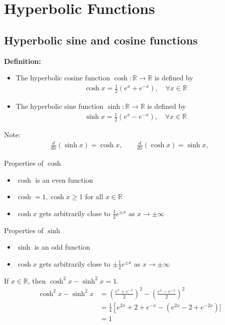 \documentclass{report}
\begin{document}
\chapter{Hyperbolic Functions}
	
	\section{Hyperbolic sine and cosine functions}

	\textbf{Definition:}
	\begin{itemize}
		\item The hyperbolic cosine function $\cosh: \mathbb{R} \to \mathbb{R}$ is defined by
			\begin{align*}
				\cosh x = \frac{1}{2} (e^x + e^{-x}), \quad \forall x \in \mathbb{R}
			\end{align*}
		\item The hyperbolic sine function $\sinh: \mathbb{R} \to \mathbb{R}$ is defined by
			\begin{align*}
				\sinh x = \frac{1}{2} (e^x - e^{-x}), \quad \forall x \in \mathbb{R}
			\end{align*}
	\end{itemize}

	Note:
	\begin{align*}
		\frac{d}{dx} (\sinh x) = \cosh x, \qquad \frac{d}{dx} (\cosh x) = \sinh x,
	\end{align*}

	Properties of $\cosh$
	\begin{itemize}
		\item $\cosh$ is an even function
		\item $\cosh = 1, \cosh x \geq 1$ for all $x \in \mathbb{R}$
		\item $\cosh x$ gets arbitrarily close to $\frac{1}{2} e^{\pm x}$ as $x \to \pm \infty$
	\end{itemize}

	Properties of $\sinh$
	\begin{itemize}
		\item $\sinh$ is an odd function
		\item $\cosh x$ gets arbitrarily close to $\pm \frac{1}{2} e^{\pm x}$ as $x \to \pm \infty$
	\end{itemize}

	If $x \in \mathbb{R}$, then $\cosh^2 x - \sinh^2 x = 1$.
		\begin{align*}
			\cosh^2 x - \sinh^2 x &= \left(\frac{e^x + e^{-x}}{2}\right)^2 - \left(\frac{e^x - e^{-x}}{2}\right)^2	\\
								  &= \frac{1}{4} \left[e^{2x} + 2 + e^{-x} - (e^{2x} - 2 + e^{-2x})]	\\
								  &= 1
		\end{align*}
\end{document}
